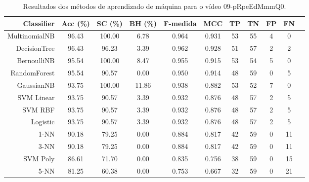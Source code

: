 \begin{table}[!htb]
\centering
\caption{Resultados dos métodos de aprendizado de máquina para o vídeo 09-pRpeEdMmmQ0.}
\label{tab:09-pRpeEdMmmQ0}
\begin{tabular}{r|c|c|c|c|c|c|c|c|c|c}
\hline\hline
Classifier & Acc (\%) & SC (\%) & BH (\%) & F-medida & MCC & TP & TN & FP & FN \\ \hline
MultinomialNB & 96.43 & 100.00 & 6.78 & 0.964 & 0.931 & 53 & 55 & 4 & 0 \\ 
DecisionTree & 96.43 & 96.23 & 3.39 & 0.962 & 0.928 & 51 & 57 & 2 & 2 \\ 
BernoulliNB & 95.54 & 100.00 & 8.47 & 0.955 & 0.915 & 53 & 54 & 5 & 0 \\ 
RandomForest & 95.54 & 90.57 & 0.00 & 0.950 & 0.914 & 48 & 59 & 0 & 5 \\ 
GaussianNB & 93.75 & 100.00 & 11.86 & 0.938 & 0.882 & 53 & 52 & 7 & 0 \\ 
SVM Linear & 93.75 & 90.57 & 3.39 & 0.932 & 0.876 & 48 & 57 & 2 & 5 \\ 
SVM RBF & 93.75 & 90.57 & 3.39 & 0.932 & 0.876 & 48 & 57 & 2 & 5 \\ 
Logistic & 93.75 & 90.57 & 3.39 & 0.932 & 0.876 & 48 & 57 & 2 & 5 \\ 
1-NN & 90.18 & 79.25 & 0.00 & 0.884 & 0.817 & 42 & 59 & 0 & 11 \\ 
3-NN & 90.18 & 79.25 & 0.00 & 0.884 & 0.817 & 42 & 59 & 0 & 11 \\ 
SVM Poly & 86.61 & 71.70 & 0.00 & 0.835 & 0.756 & 38 & 59 & 0 & 15 \\ 
5-NN & 81.25 & 60.38 & 0.00 & 0.753 & 0.667 & 32 & 59 & 0 & 21 \\ 
\hline\hline
\end{tabular}
\end{table}
